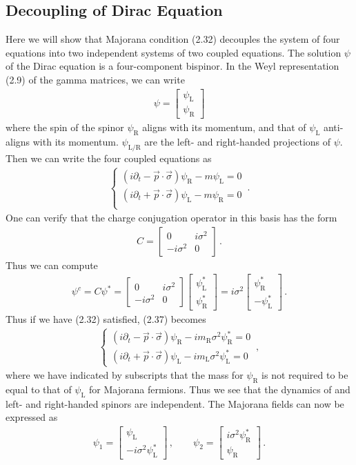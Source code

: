\documentclass[11pt, oneside]{book}
\theoremstyle{break}
\theoremstyle{break}
\newcommand{\pd}{\partial}
\newcommand{\bmat}[1]{\begin{bmatrix} #1 \end{bmatrix}}
\begin{document}
\subsection{Decoupling of Dirac Equation}
Here we will show that Majorana condition (2.32) decouples the system of four equations into two independent systems of two coupled equations. The solution $\psi$ of the Dirac equation is a four-component bispinor. In the Weyl representation (2.9) of the gamma matrices, we can write
\begin{align}
\psi = \bmat{\psi_{\text{L}} \\ \psi_{\text{R}}}
\end{align}
where the spin of the spinor $\psi_{\text{R}}$ aligns with its momentum, and that of $\psi_{\text{L}}$ anti-aligns with its momentum. $\psi_{\text{L/R}}$ are the left- and right-handed projections of $\psi$. Then we can write the four coupled equations as
\begin{align}
\begin{cases}
(i\pd_t - \vec{p}\cdot \vec{\sigma})\psi_{\text{R}} - m\psi_{\text{L}} = 0\\
(i\pd_t + \vec{p}\cdot \vec{\sigma})\psi_{\text{L}} - m\psi_{\text{R}} = 0\\
\end{cases}\,.
\end{align}
One can verify that the charge conjugation operator in this basis has the form
\begin{align}
C = \bmat{0 & i\sigma^2 \\ -i\sigma^2 & 0}\,.
\end{align}
Thus we can compute
\begin{align}
\psi^c = C\psi^* = 
 \bmat{0 & i\sigma^2 \\ -i\sigma^2 & 0} 
\bmat{\psi_{\text{L}}^*\\ \psi_{\text{R}}^*} = i\sigma^2\bmat{\psi_{\text{R}}^*\\ -\psi_{\text{L}}^*}\,.
\end{align}
Thus if we have (2.32) satisfied, (2.37) becomes 
\begin{align}
\begin{cases}
(i\pd_t - \vec{p}\cdot \vec{\sigma}) \psi_{\text{R}} - im_{\text{R}} \sigma^2 \psi_{\text{R}}^*=0\\
(i\pd_t + \vec{p}\cdot \vec{\sigma}) \psi_{\text{L}} - im_{\text{L}} \sigma^2 \psi_{\text{L}}^*=0
\end{cases}\,,
\end{align}
where we have indicated by subscripts that the mass for $\psi_{\text{R}}$ is not required to be equal to that of $\psi_{\text{L}}$ for Majorana fermions. Thus we see that the dynamics of and left- and right-handed spinors are independent. The Majorana fields can now be expressed as
\begin{align}
\psi_1 = \bmat{
\psi_{\text{L}}\\
-i \sigma^2 \psi_{\text{L}}^*
}\,,\qquad
\psi_2 = \bmat{
i \sigma^2 \psi_{\text{R}}^*\\
\psi_{\text{R}}
}\,.
\end{align}
\end{document}
